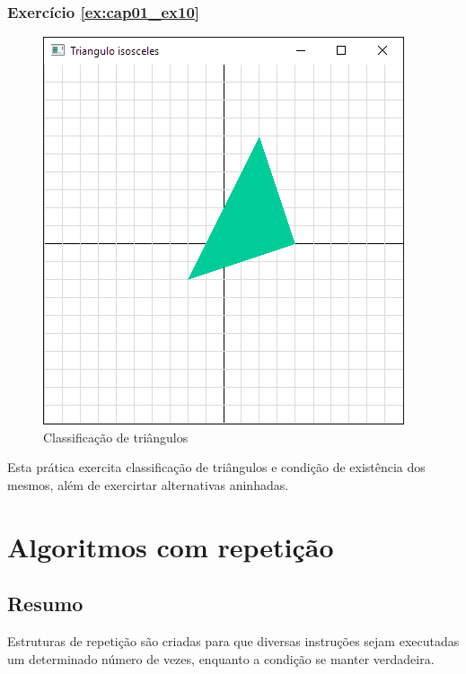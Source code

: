 \subsection*{Exercício \ref{ex:cap01_ex10}}
\begin{figure}[ht]
  \centerline{\includegraphics[width=.5\textwidth]{img/cap1_ex10.png}}
  \caption{Classificação de triângulos}
  \label{fig:cap01_ex4}
\end{figure}
Esta prática exercita classificação de triângulos e condição de existência dos mesmos, além de exercirtar alternativas aninhadas.


\chapter[Algoritmos com repetição]
{Algoritmos com repetição}



\section*{Resumo}

Estruturas de repetição são criadas para que diversas instruções sejam executadas um determinado número de vezes, enquanto a condição se manter verdadeira.


%



